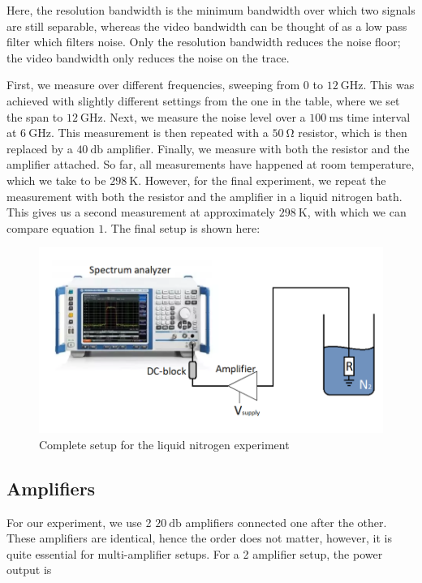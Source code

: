 \documentclass[english,12pt,a4paper]{article}
\begin{document}
Here, the resolution bandwidth is the minimum bandwidth over which two signals are still separable, whereas the video bandwidth can be thought of as a low pass filter which filters noise. Only the resolution bandwidth reduces the noise floor; the video bandwidth only reduces the noise on the trace.

First, we measure over different frequencies, sweeping from $0$ to  $\qty{12}{\giga\hertz}$. This was achieved with slightly different settings from the one in the table, where we set the span to $\qty{12}{\giga\hertz}$. Next, we measure the noise level over a $\qty{100}{\milli\second}$ time interval at $\qty{6}{\giga\hertz}$. This measurement is then repeated with a $\qty{50}{\ohm}$ resistor, which is then replaced by a $\qty{40}{\decibel}$ amplifier. Finally, we measure with both the resistor and the amplifier attached. So far, all measurements have happened at room temperature, which we take to be $\qty{298}{\kelvin}$. However, for the final experiment, we repeat the measurement with both the resistor and the amplifier in a liquid nitrogen bath. This gives us a second measurement at approximately $\qty{298}{\kelvin}$, with which we can compare equation $1$. The final setup is shown here:

\begin{figure}[H]
	\includegraphics[width=1\linewidth]{PHYS_C0258_Noise_measurements}
	\caption{Complete setup for the liquid nitrogen experiment}
	\label{fig:physc0258noisemeasurements}
\end{figure}
 
 \subsection{Amplifiers}
 
 For our experiment, we use 2 $\qty{20}{\decibel}$ amplifiers connected one after the other. These amplifiers are identical, hence the order does not matter, however, it is quite essential for multi-amplifier setups. For a 2 amplifier setup, the power output is 
 
\end{document}
